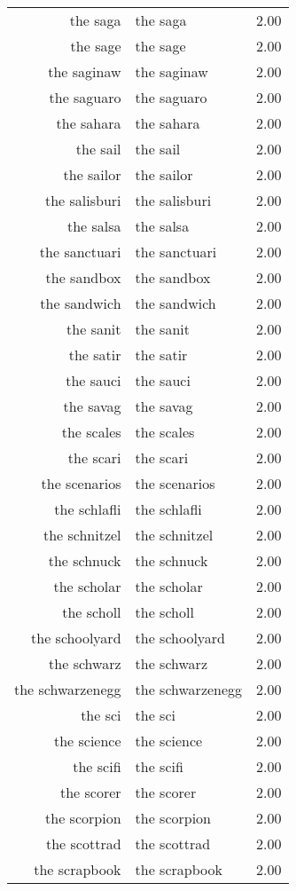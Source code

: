 \begin{table}[ht]
\begin{tabular}{rlr}
  the saga & the saga & 2.00 \\ 
  the sage & the sage & 2.00 \\ 
  the saginaw & the saginaw & 2.00 \\ 
  the saguaro & the saguaro & 2.00 \\ 
  the sahara & the sahara & 2.00 \\ 
  the sail & the sail & 2.00 \\ 
  the sailor & the sailor & 2.00 \\ 
  the salisburi & the salisburi & 2.00 \\ 
  the salsa & the salsa & 2.00 \\ 
  the sanctuari & the sanctuari & 2.00 \\ 
  the sandbox & the sandbox & 2.00 \\ 
  the sandwich & the sandwich & 2.00 \\ 
  the sanit & the sanit & 2.00 \\ 
  the satir & the satir & 2.00 \\ 
  the sauci & the sauci & 2.00 \\ 
  the savag & the savag & 2.00 \\ 
  the scales & the scales & 2.00 \\ 
  the scari & the scari & 2.00 \\ 
  the scenarios & the scenarios & 2.00 \\ 
  the schlafli & the schlafli & 2.00 \\ 
  the schnitzel & the schnitzel & 2.00 \\ 
  the schnuck & the schnuck & 2.00 \\ 
  the scholar & the scholar & 2.00 \\ 
  the scholl & the scholl & 2.00 \\ 
  the schoolyard & the schoolyard & 2.00 \\ 
  the schwarz & the schwarz & 2.00 \\ 
  the schwarzenegg & the schwarzenegg & 2.00 \\ 
  the sci & the sci & 2.00 \\ 
  the science & the science & 2.00 \\ 
  the scifi & the scifi & 2.00 \\ 
  the scorer & the scorer & 2.00 \\ 
  the scorpion & the scorpion & 2.00 \\ 
  the scottrad & the scottrad & 2.00 \\ 
  the scrapbook & the scrapbook & 2.00 \\ 

\end{tabular}
\end{table}
